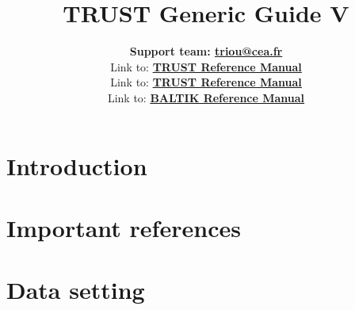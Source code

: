 \documentclass[a4paper,11pt,english]{report}
\def\TRUSTVERSION{}
\def\TRUSTVERSION{V\TRUSTV}
\newcommand{\trust}{\textbf{TRUST}\xspace}
\begin{document}
\title{\vspace{2cm}\Huge \bfseries{TRUST Generic Guide \TRUSTVERSION}}
\author{
\vspace{2cm} %
\LARGE \textbf{Support team: \href{mailto:triou@cea.fr}{triou@cea.fr}} \\
\ifx \BALTROOT \empty
\vspace{2cm} %
Link to: \LARGE \textbf{\href{run:\TRUSTROOTLATEX/Outils/TRIOXDATA/XTriou/doc.pdf}{\trust Reference Manual}}\\
\else
\vspace{2cm} %
Link to: \LARGE \textbf{\href{run:\TRUSTROOTLATEX/Outils/TRIOXDATA/XTriou/doc.pdf}{\trust Reference Manual}}\\
Link to: \LARGE \textbf{\href{run:\BALTROOT/build/xdata/XTriou/doc.pdf}{BALTIK Reference Manual}}\\
\fi
}

\maketitle
\tableofcontents{}
\newpage


%
\chapter{Introduction}
%




%
\chapter{Important references}
%




%
\chapter{Data setting}
%

\end{document}
